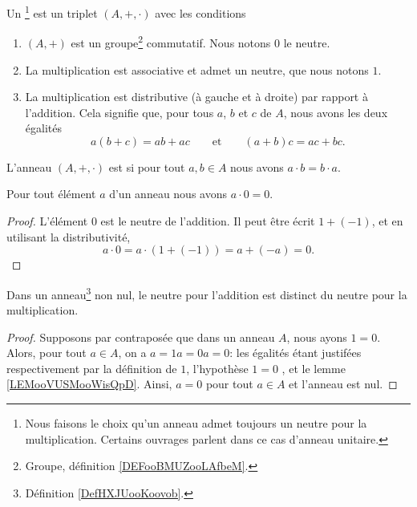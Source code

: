 \begin{definition}     \label{DefHXJUooKoovob}
	Un \footnote{Nous faisons le choix qu'un anneau admet toujours un neutre pour la multiplication. Certains ouvrages parlent dans ce cas d'anneau unitaire.} est un triplet \( (A,+,\cdot)\) avec les conditions
	\begin{enumerate}
		\item
		      \( (A,+)\) est un groupe\footnote{Groupe, définition \ref{DEFooBMUZooLAfbeM}.} commutatif. Nous notons \( 0\) le neutre.
		\item
		      La multiplication est associative et admet un neutre, que nous notons \( 1\).
		\item       \label{ITEMooGMNOooSTGiXw}
		      La multiplication est distributive (à gauche et à droite) par rapport à l'addition. Cela signifie que, pour tous \( a \), \( b \) et \( c \) de \( A \), nous avons les deux égalités
		      \begin{equation}
			      a(b+c) = ab + ac \qquad\text{et}\qquad (a+b)c = ac + bc.
		      \end{equation}
	\end{enumerate}
	L'anneau \( (A,+,\cdot)\) est  si pour tout \( a,b\in A\) nous avons \( a\cdot b=b\cdot a\).
\end{definition}

\begin{lemma}       \label{LEMooVUSMooWisQpD}
	Pour tout élément \( a\) d'un anneau nous avons \( a\cdot 0=0\).
\end{lemma}

\begin{proof}
	L'élément \( 0\) est le neutre de l'addition. Il peut être écrit \( 1+(-1)\), et en utilisant la distributivité,
	\begin{equation}
		a\cdot 0=a\cdot (1+(-1))=a+(-a)=0.
	\end{equation}
\end{proof}

\begin{proposition}     \label{PROPooNCCGooXjVyVt}
	Dans un anneau\footnote{Définition \ref{DefHXJUooKoovob}.} non nul, le neutre pour l'addition est distinct du neutre pour la multiplication.
\end{proposition}
\begin{proof}
	Supposons par contraposée que dans un anneau \( A\), nous ayons \( 1 = 0 \). Alors, pour tout \( a \in A \), on a \( a = 1a = 0a = 0 \): les égalités étant justifées respectivement par la définition de \( 1 \), l'hypothèse \( 1 = 0 \) , et le lemme \ref{LEMooVUSMooWisQpD}. Ainsi, \( a = 0\) pour tout \( a\in A\) et l'anneau est nul.
\end{proof}

